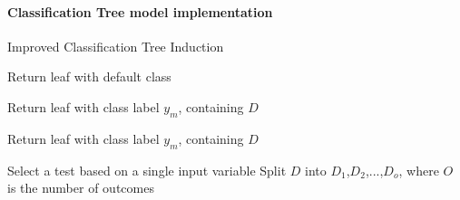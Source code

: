\documentclass[10pt, conference]{IEEEtran}
\begin{document}
\paragraph{Classification Tree model implementation}

\begin{algorithm}[H]
    \caption{Improved Classification Tree Induction}
    \label{alg:CTI_imporved_algorithm}
    \begin{algorithmic}[1]
                \State Return leaf with default class
            \EndIf
            
                \State Return leaf with class label $y_m$, containing $D$
            \EndIf

                \State Return leaf with class label $y_m$, containing $D$
            \EndIf

            \State Select a test based on a single input variable
            \State Split $D$ into $D_1$,$D_2$,...,$D_o$, where $O$ is the number of outcomes
                \State {}
            \EndFor
        \EndFunction
    \end{algorithmic}
\end{algorithm}
\end{document}

